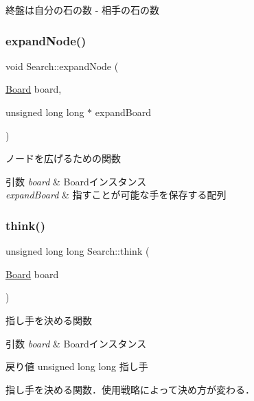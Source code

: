 終盤は自分の石の数 -\/ 相手の石の数 \mbox{\label{class_search_ae52e3dab738eab0b77d2860eddeb2a88}} 
\subsubsection{\texorpdfstring{expand\+Node()}{expandNode()}}
{\footnotesize\ttfamily void Search\+::expand\+Node (\begin{DoxyParamCaption}\item[{\mbox{\hyperlink{class_board}{Board}}}]{board,  }\item[{unsigned long long $\ast$}]{expand\+Board }\end{DoxyParamCaption})\hspace{0.3cm}{\ttfamily [inline]}}



ノードを広げるための関数 


\begin{DoxyParams}{引数}
{\em board} & Boardインスタンス \\
\hline
{\em expand\+Board} & 指すことが可能な手を保存する配列 \\
\hline
\end{DoxyParams}
\mbox{\label{class_search_a4b87f03138aff1c1b0ec6bb53dccee91}} 
\subsubsection{\texorpdfstring{think()}{think()}}
{\footnotesize\ttfamily unsigned long long Search\+::think (\begin{DoxyParamCaption}\item[{\mbox{\hyperlink{class_board}{Board}}}]{board }\end{DoxyParamCaption})\hspace{0.3cm}{\ttfamily [inline]}}



指し手を決める関数 


\begin{DoxyParams}{引数}
{\em board} & Boardインスタンス \\
\hline
\end{DoxyParams}
\begin{DoxyReturn}{戻り値}
unsigned long long 指し手
\end{DoxyReturn}
指し手を決める関数．使用戦略によって決め方が変わる．

